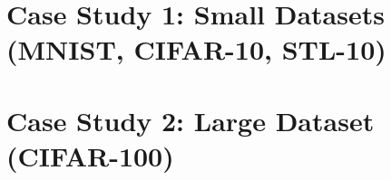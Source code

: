 \section{Case Study 1: Small Datasets (MNIST, CIFAR-10, STL-10)}
\section{Case Study 2: Large Dataset (CIFAR-100)}

\ifpdf
    \graphicspath{{Chapter2/Figs/Raster/}{Chapter2/Figs/PDF/}{Chapter2/Figs/}}
\else
    \graphicspath{{Chapter2/Figs/Vector/}{Chapter2/Figs/}}
\fi


